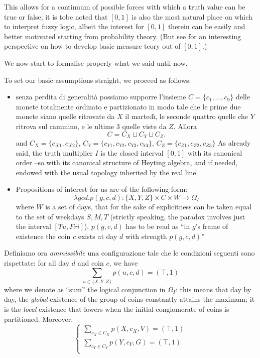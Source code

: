 \begin{example}
\begin{remark}
	This allows for a continuum of possible forces with which a truth value can be true or false;  it is tobe noted that $[0,1]$ is also the most natural place on which to interpret fuzzy logic, albeit the interest for $[0,1]$ therein can be easily and better motivated starting from probability theory. (But see \cite{} for an interesting perspective on how to develop basic measure teory out of $[0,1]$.)
\end{remark}
	We now start to formalise properly what we said until now.

	To set our basic assumptions straight, we proceed as follows:
	\begin{itemize}
		\item senza perdita di generalità possiamo supporre l'insieme $C = \{c_1,\dots,c_9\}$ delle monete totalmente ordinato e partizionato in modo tale che le prime due monete siano quelle ritrovate da $X$ il martedì, le seconde quattro quelle che $Y$ ritrova sul cammino, e le ultime 3 quelle viste da $Z$. Allora
		      \[C = C_X \sqcup C_Y \sqcup C_Z.\]
		      and $C_X = \{c_{X1}, c_{X2}\}$, $C_Y = \{
			      c_{Y1},c_{Y2},c_{Y3},c_{Y4}\}$, $C_Z= \{c_{Z1}, c_{Z2}, c_{Z3}\}$ As already said, the truth multiplier $I$ is the closed interval $[0,1]$ with its canonical order --so with its canonical structure of Heyting algebra, and if needed, endowed with the usual topology inherited by the real line.
		\item Propositions of interest for us are of the following form:
		      \[\lambda gcd.p(g, c, d) : \{X,Y,Z\}\times C\times W \to \Omega_I\]
		      where $W$ is a set of days, that for the sake of explicitness can be taken equal to the set of weekdays $S,M,T$ (strictly speaking, the paradox involves just the interval $[Tu,Fri]$). $p(g,c,d)$ has to be read as ``in $g$'s frame of existence the coin $c$ exists at day $d$ with strength $p(g,c,d)$''
	\end{itemize}
	Definiamo ora \emph{ammissibile} una configurazione tale che le condizioni seguenti sono rispettate: for all day $d$ and coin $c$, we have
	\[
		\sum_{u\in \{X,Y,Z\}} p(u,c,d) = (\top, 1)
	\]
	where we denote as ``sum'' the logical conjunction in $\Omega_I$: this means that day by day, the \emph{global} existence of the group of coins constantly attains the maximum; it is the \emph{local} existence that lowers when the initial conglomerate of coins is partitioned. Moreover,
	\[
		\begin{cases}
			\sum_{c_X\in C_X} p(X,c_X,V) = (\top,1) \\
			\sum_{c_Y\in C_Y} p(Y,c_Y,G) = (\top,1) \\

\end{cases}\]
\end{example}
